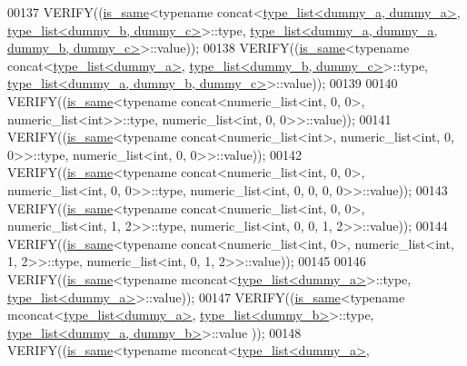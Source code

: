 \begin{DoxyCode}
00137   VERIFY((\hyperlink{struct_eigen_1_1internal_1_1is__same}{is\_same}<\textcolor{keyword}{typename} concat<\hyperlink{struct_eigen_1_1internal_1_1type__list}{type\_list<dummy\_a, dummy\_a>}, 
      \hyperlink{struct_eigen_1_1internal_1_1type__list}{type\_list<dummy\_b, dummy\_c>}>::type, 
      \hyperlink{struct_eigen_1_1internal_1_1type__list}{type\_list<dummy\_a, dummy\_a, dummy\_b, dummy\_c>}>::value));
00138   VERIFY((\hyperlink{struct_eigen_1_1internal_1_1is__same}{is\_same}<\textcolor{keyword}{typename} concat<\hyperlink{struct_eigen_1_1internal_1_1type__list}{type\_list<dummy\_a>}, 
      \hyperlink{struct_eigen_1_1internal_1_1type__list}{type\_list<dummy\_b, dummy\_c>}>::type, 
      \hyperlink{struct_eigen_1_1internal_1_1type__list}{type\_list<dummy\_a, dummy\_b, dummy\_c>}>::value));
00139 
00140   VERIFY((\hyperlink{struct_eigen_1_1internal_1_1is__same}{is\_same}<\textcolor{keyword}{typename} concat<numeric\_list<int, 0, 0>, numeric\_list<int>>::type, 
      numeric\_list<int, 0, 0>>::value));
00141   VERIFY((\hyperlink{struct_eigen_1_1internal_1_1is__same}{is\_same}<\textcolor{keyword}{typename} concat<numeric\_list<int>, numeric\_list<int, 0, 0>>::type, 
      numeric\_list<int, 0, 0>>::value));
00142   VERIFY((\hyperlink{struct_eigen_1_1internal_1_1is__same}{is\_same}<\textcolor{keyword}{typename} concat<numeric\_list<int, 0, 0>, numeric\_list<int, 0, 0>>::type, 
      numeric\_list<int, 0, 0, 0, 0>>::value));
00143   VERIFY((\hyperlink{struct_eigen_1_1internal_1_1is__same}{is\_same}<\textcolor{keyword}{typename} concat<numeric\_list<int, 0, 0>, numeric\_list<int, 1, 2>>::type, 
      numeric\_list<int, 0, 0, 1, 2>>::value));
00144   VERIFY((\hyperlink{struct_eigen_1_1internal_1_1is__same}{is\_same}<\textcolor{keyword}{typename} concat<numeric\_list<int, 0>, numeric\_list<int, 1, 2>>::type, 
      numeric\_list<int, 0, 1, 2>>::value));
00145 
00146   VERIFY((\hyperlink{struct_eigen_1_1internal_1_1is__same}{is\_same}<\textcolor{keyword}{typename} mconcat<\hyperlink{struct_eigen_1_1internal_1_1type__list}{type\_list<dummy\_a>}>::type, 
      \hyperlink{struct_eigen_1_1internal_1_1type__list}{type\_list<dummy\_a>}>::value));
00147   VERIFY((\hyperlink{struct_eigen_1_1internal_1_1is__same}{is\_same}<\textcolor{keyword}{typename} mconcat<\hyperlink{struct_eigen_1_1internal_1_1type__list}{type\_list<dummy\_a>}, 
      \hyperlink{struct_eigen_1_1internal_1_1type__list}{type\_list<dummy\_b>}>::type, \hyperlink{struct_eigen_1_1internal_1_1type__list}{type\_list<dummy\_a, dummy\_b>}>::value
      ));
00148   VERIFY((\hyperlink{struct_eigen_1_1internal_1_1is__same}{is\_same}<\textcolor{keyword}{typename} mconcat<\hyperlink{struct_eigen_1_1internal_1_1type__list}{type\_list<dummy\_a>}, 

\end{DoxyCode}

